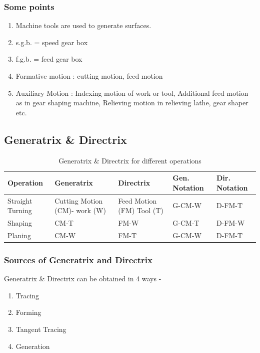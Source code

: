 \documentclass{article}
\begin{document}
\subsubsection*{Some points}
\begin{enumerate}
  \item Machine tools are used to generate surfaces. 
  \item s.g.b. = speed gear box 
  \item f.g.b. = feed gear box 
  \item Formative motion : cutting motion, feed motion 
  \item Auxiliary Motion : Indexing motion of work or tool, Additional feed motion as in gear shaping machine, Relieving motion in relieving lathe, gear shaper etc. 
\end{enumerate}

\subsection*{Generatrix \& Directrix}
\begin{table}[htbp]
  \centering
  \begin{tabularx}{\textwidth}{XXXXX}
  \hline
  Operation & Generatrix & Directrix & Gen. Notation & Dir. Notation \\
    \hline 
  Straight Turning & Cutting Motion (CM)- work (W) & Feed Motion (FM) Tool (T) & G-CM-W & D-FM-T \\

  Shaping & CM-T & FM-W & G-CM-T & D-FM-W \\

  Planing & CM-W & FM-T & G-CM-W & D-FM-T \\
  \hline
  \end{tabularx}
  \caption{Generatrix \& Directrix for different operations}
\end{table}

\subsubsection*{Sources of Generatrix and Directrix}
Generatrix \& Directrix can be obtained in 4 ways - 
\begin{enumerate}
  \item Tracing 
  \item Forming
  \item Tangent Tracing 
  \item Generation 
\end{enumerate}
\end{document}
